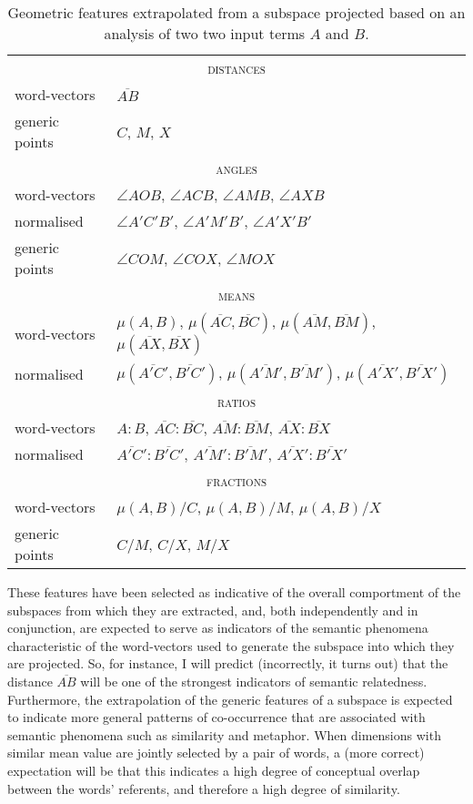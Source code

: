 \begin{table}
\centering
\begin{tabular}{ll}
\hline
\multicolumn{2}{c}{\textsc{distances}} \\
word-vectors & $\overline{AB}$ \\
generic points & $C$, \quad $M$, \quad $X$ \\
\hline
\multicolumn{2}{c}{\textsc{angles}} \\
word-vectors & $\angle AOB$, \quad $\angle ACB$, \quad $\angle AMB$, \quad $\angle AXB$ \\
normalised & $\angle A'C'B'$, \quad $\angle A'M'B'$, \quad $\angle A'X'B'$ \\
generic points & $\angle COM$, \quad $\angle COX$, \quad $\angle MOX$ \\
\hline
\multicolumn{2}{c}{\textsc{means}} \\
word-vectors & $\mu (A,B)$, \quad $\mu (\overline{AC},\overline{BC})$, \quad $\mu (\overline{AM},\overline{BM})$, \quad $\mu (\overline{AX},\overline{BX})$ \\
normalised & $\mu (\overline{A'C'},\overline{B'C'})$, \quad $\mu (\overline{A'M'},\overline{B'M'})$, \quad $\mu (\overline{A'X'},\overline{B'X'})$ \\
\hline
\multicolumn{2}{c}{\textsc{ratios}} \\
word-vectors & $A:B$, \quad $\overline{AC}:\overline{BC}$, \quad $\overline{AM}:\overline{BM}$, \quad $\overline{AX}:\overline{BX}$ \\
normalised & $\overline{A'C'}:\overline{B'C'}$, \quad $\overline{A'M'}:\overline{B'M'}$, \quad $\overline{A'X'}:\overline{B'X'}$ \\
\hline
\multicolumn{2}{c}{\textsc{fractions}} \\
word-vectors & $\mu (A,B)/C$, \quad $\mu (A,B)/M$, \quad $\mu (A,B)/X$ \\
generic points & $C/M$, \quad $C/X$, \quad $M/X$ \\
\hline
\end{tabular}
\caption{Geometric features extrapolated from a subspace projected based on an analysis of two two input terms $A$ and $B$.}
\label{tab:features}
\end{table}

\noindent These features have been selected as indicative of the overall comportment of the subspaces from which they are extracted, and, both independently and in conjunction, are expected to serve as indicators of the semantic phenomena characteristic of the word-vectors used to generate the subspace into which they are projected.  So, for instance, I will predict (incorrectly, it turns out) that the distance $\overline{AB}$ will be one of the strongest indicators of semantic relatedness.  Furthermore, the extrapolation of the generic features of a subspace is expected to indicate more general patterns of co-occurrence that are associated with semantic phenomena such as similarity and metaphor.  When dimensions with similar mean value are jointly selected by a pair of words, a (more correct) expectation will be that this indicates a high degree of conceptual overlap between the words' referents, and therefore a high degree of similarity.

